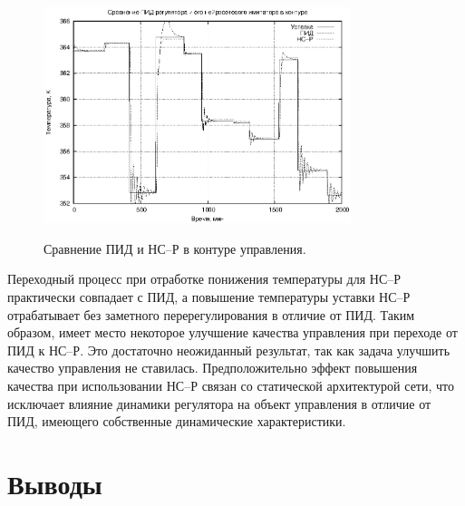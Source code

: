 \begin{figure}
  \centering
  \includegraphics[width=0.8\textwidth,%
    totalheight=0.35\textheight]{cstr_pid_vs_nnc_inloop_rus} \\
  \caption{Сравнение ПИД и НС--Р в контуре управления.}%
  \label{fig:cstr_pid_vs_nnc_inloop_rus}
\end{figure}

Переходный процесс при отработке понижения температуры для НС--Р
практически совпадает с ПИД, а повышение температуры уставки НС--Р
отрабатывает без заметного перерегулирования в отличие от ПИД.  Таким
образом, имеет место некоторое улучшение качества управления при
переходе от ПИД к НС--Р.  Это достаточно неожиданный результат, так
как задача улучшить качество управления не ставилась.
Предположительно эффект повышения качества при использовании НС--Р
связан со статической архитектурой сети, что исключает влияние
динамики регулятора на объект управления в отличие от ПИД, имеющего
собственные динамические характеристики.


\section{Выводы}

